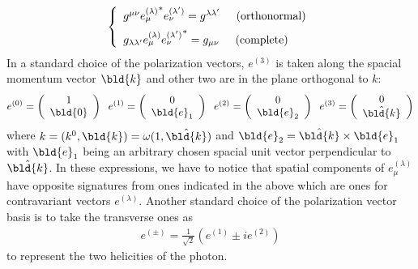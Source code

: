 \begin{eqnarray}
\left\{
\begin{array}{l}
g^{\mu \nu }{e_\mu^{(\lambda)}}^*   e_\nu^{(\lambda')}
=
g^{\lambda \lambda'}
\hspace{5mm}
\mbox{(orthonormal)}
\vspace{2mm}
\\
g_{\lambda \lambda'} e_\mu^{(\lambda)} {e_\nu^{(\lambda')}}^* 
= g_{\mu \nu}
\hspace{5mm}
\mbox{(complete)}
\end{array}
\right.
\end{eqnarray}
In a standard choice of the polarization vectors,
$e^{(3)}$ is taken along the spacial momentum vector $\bld{k}$ 
and other two are in the plane orthogonal to $k$:
\begin{eqnarray}
e^{(0)} =
\left(
\begin{array}{c}
1\\ \bld{0}
\end{array}
\right)
\hspace{2mm}
e^{(1)} =
\left(
\begin{array}{c}
0\\ \bld{e}_1
\end{array}
\right)
\hspace{2mm}
e^{(2)} =
\left(
\begin{array}{c}
0\\ \bld{e}_2
\end{array}
\right)
\hspace{2mm}
e^{(3)} =
\left(
\begin{array}{c}
0\\ \hat{\bld{k}}
\end{array}
\right)
\label{eqn:phopolvecstandardchoice}
\end{eqnarray}
where $k = (k^0, \bld{k}) = \omega (1, \hat{\bld{k}})$ and
$\bld{e}_2 = \hat{\bld{k}} \times \bld{e}_1$ with
$\bld{e}_1$ being an arbitrary chosen spacial unit vector perpendicular 
to $\hat{\bld{k}}$.
In these expressions, we have to notice that
spatial components of $e_\mu^{(\lambda)}$ have opposite
signatures from ones indicated in the above which are ones for
 contravariant vectors $e^{(\lambda)}$.
Another standard choice of the polarization vector basis is to take
the transverse ones as
\begin{eqnarray}
e^{(\pm)} = \frac{1}{\sqrt{2}} 
\left(
e^{(1)} \pm i e^{(2)}
\right)
\end{eqnarray}
to represent the two helicities of the photon.

